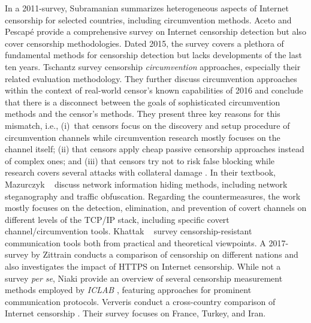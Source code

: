 In a 2011-survey, Subramanian \cite{subramanian2011growth} summarizes heterogeneous aspects of Internet censorship for selected countries, including circumvention methods. 
%
Aceto and Pescapé \cite{Aceto2015} provide a comprehensive survey on Internet censorship detection but also cover censorship methodologies. Dated 2015, the survey covers a plethora of fundamental methods for censorship detection %
but lacks developments of the last ten years. 
%
Tschantz \ea \cite{tschantz2016sok} survey censorship \emph{circumvention} approaches, especially their related evaluation methodology. They further discuss circumvention approaches within the context of real-world censor's known capabilities of 2016 and conclude that there is a disconnect between the goals of sophisticated circumvention methods and the censor's methods. They present three key reasons for this mismatch, i.e., (i)~that censors focus on the discovery and setup procedure of circumvention channels while circumvention research mostly focuses on the channel itself; (ii) that censors apply cheap passive censorship approaches instead of complex ones; and (iii) that censors try not to risk false blocking while research covers several attacks with collateral damage \cite{tschantz2016sok}. 
%
In their textbook, Mazurczyk \ea~\cite{NIHbook} discuss network information hiding methods, including network steganography and traffic obfuscation. Regarding the countermeasures, the work mostly focuses on the detection, elimination, and prevention of covert channels on different levels of the TCP/IP stack, including specific covert channel/circumvention tools. 
%
Khattak \ea~\cite{Khattak:2016} survey censorship-resistant communication tools both from practical and theoretical viewpoints. 
%
A 2017-survey by Zittrain \ea \cite{Zittrain2017shifting} conducts a comparison of censorship on different nations and also investigates the impact of HTTPS on Internet censorship. 
%
While not a survey \emph{per se}, Niaki \ea provide an overview of several censorship measurement methods employed by \emph{ICLAB} \cite{ICLab:SP20}, featuring approaches for prominent communication protocols. 
%
Ververis \ea conduct a cross-country comparison of Internet censorship \cite{ververis2020cross}. Their survey focuses on France, Turkey, and Iran. 
%
